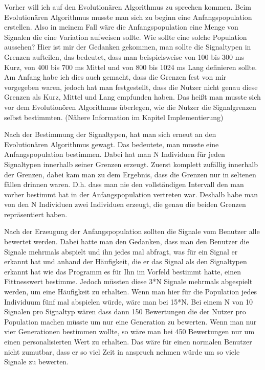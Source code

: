 Vorher will ich auf den Evolutionären Algorithmus zu sprechen kommen. Beim Evolutionären Algorithmus musste man sich zu beginn eine Anfangspopulation erstellen. Also in meinem Fall wäre die Anfangspopulation eine Menge von Signalen die eine Variation aufweisen sollte. Wie sollte eine solche Population aussehen? Hier ist mir der Gedanken gekommen, man sollte die Signaltypen in Grenzen aufteilen, das bedeutet, dass man beispielsweise von 100 bis 300 ms Kurz, von 400 bis 700 ms Mittel und von 800 bis 1024 ms Lang definieren sollte. Am Anfang habe ich dies auch gemacht, dass die Grenzen fest von mir vorgegeben waren, jedoch  hat man festgestellt, dass die Nutzer nicht genau diese Grenzen als Kurz, Mittel und Lang empfunden haben. Das heißt man musste sich vor dem Evolutionören Algorithmus überlegen, wie die Nutzer die Signalgrenzen selbst bestimmten. (Nähere Information im Kapitel Implementierung)

Nach der Bestimmung der Signaltypen, hat man sich erneut an den Evolutionären Algorithmus gewagt. Das bedeutete, man musste eine Anfangspopulation bestimmen. Dabei hat man N Individuen für jeden Signaltypen innerhalb seiner Grenzen erzeugt. Zuerst komplett zufällig innerhalb der Grenzen, dabei kam man zu dem Ergebnis, dass die Grenzen nur in seltenen fällen drinnen waren. D.h. dass man nie den vollständigen Intervall den man vorher bestimmt hat in der Anfangspopulation vertreten war. Deshalb habe man von den N Individuen zwei Individuen erzeugt, die genau die beiden Grenzen repräsentiert haben.

Nach der Erzeugung der Anfangspopulation sollten die Signale vom Benutzer alle bewertet werden. 
Dabei hatte man den Gedanken, dass man den Benutzer die Signale mehrmals abspielt und ihn jedes mal abfragt, was für ein Signal er erkannt hat und anhand der Häufigkeit, die er das Signal als den Signaltypen erkannt hat wie das Programm es für Ihn im Vorfeld bestimmt hatte, einen Fittnesswert bestimme. Jedoch müssten diese 3*N Signale mehrmals abgespielt werden, um eine Häufigkeit zu erhalten. Wenn man hier für die Population jedes Individuum fünf mal abspielen würde, wäre man bei 15*N. Bei einem N von 10 Signalen pro Signaltyp wären dass dann 150 Bewertungen die der Nutzer pro Population machen müsste um nur eine Generation zu bewerten. Wenn man nur vier Generationen bestimmen wollte, so wäre man bei 450 Bewertungen nur um einen personalisierten Wert zu erhalten. Das wäre für einen normalen Benutzer nicht zumutbar, dass er so viel Zeit in anspruch nehmen würde um so viele Signale zu bewerten. 


